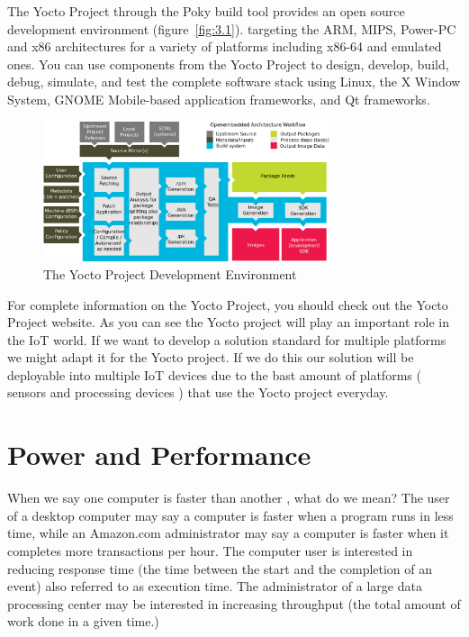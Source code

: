 The Yocto Project through the Poky build tool provides an open source
development environment (figure~\ref{fig:3.1}). targeting the ARM, MIPS,
Power-PC and x86 architectures for a variety of platforms including x86-64 and
emulated ones.  You can use components from the Yocto Project to design,
develop, build, debug, simulate, and test the complete software stack using
Linux, the X Window System, GNOME Mobile-based application frameworks, and Qt
frameworks. 

\begin{figure}[H]
\centering
\includegraphics[width=0.75\textwidth]{images/yocto-environment.png}
\caption{The Yocto Project Development Environment}
\label{fig:3.2}
\end{figure}

For complete information on the Yocto Project, you should check out the Yocto
Project website\cite{yocto-project}. As you can see the Yocto project will play
an important role in the IoT world. If we want to develop a solution standard
for multiple platforms we might adapt it for the Yocto project. If we do this
our solution will be deployable into multiple IoT devices due to the bast
amount of platforms ( sensors and processing devices ) that use the Yocto
project everyday.

\section{Power and Performance}

\noindent
When we say one computer is faster than another , what do we mean? The user
of a desktop computer may say a computer is faster when a program runs in less
time, while an Amazon.com administrator may say a computer is faster when it
completes more transactions per hour. The computer user is interested in 
reducing response time (the time between the start and the completion of an 
event) also referred to as execution time. The administrator of a large data 
processing center may be interested in increasing throughput (the total amount 
of work done in a given time.) 

